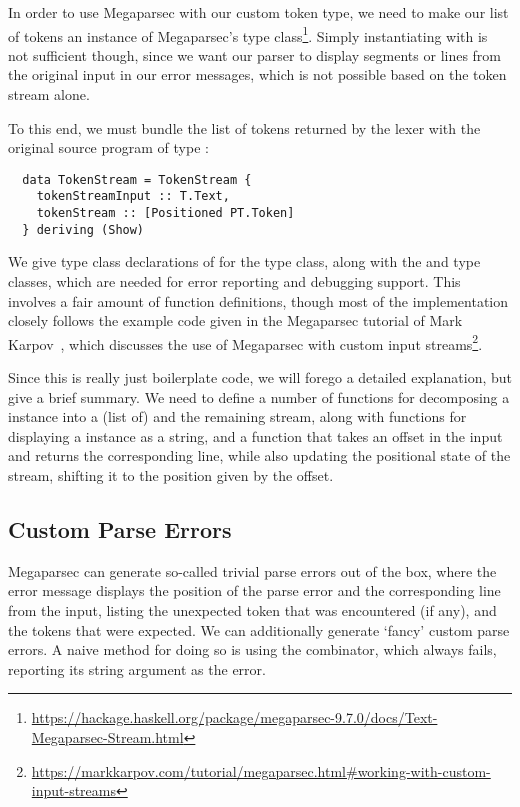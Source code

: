 In order to use Megaparsec with our custom token type, we need to make our list
of tokens an instance of Megaparsec's  type class\footnote{\url{https://hackage.haskell.org/package/megaparsec-9.7.0/docs/Text-Megaparsec-Stream.html}}.
Simply instantiating  with  is not
sufficient though, since we want our parser to display segments or lines from
the original input in our error messages, which is not possible based on the
token stream alone.

To this end, we must bundle the list of tokens returned by the lexer with the
original source program of type :
%
\begin{verbatim}
  data TokenStream = TokenStream {
    tokenStreamInput :: T.Text,
    tokenStream :: [Positioned PT.Token]
  } deriving (Show)
\end{verbatim}
%
We give type class declarations of  for the 
type class, along with the  and 
type classes, which are needed for error reporting and debugging support.
This involves a fair amount of function definitions, though most of the
implementation closely follows the example code given in the Megaparsec tutorial
of Mark Karpov~\citep{Karpov2019}, which discusses the use of Megaparsec with custom input
streams\footnote{\url{https://markkarpov.com/tutorial/megaparsec.html\#working-with-custom-input-streams}}.

Since this is really just boilerplate code, we will forego a detailed
explanation, but give a brief summary.
We need to define a number of functions for decomposing a 
instance into a (list of)  and the remaining stream,
along with functions for displaying a  instance as a
string, and a function that takes an offset in the input and returns the
corresponding line, while also updating the positional state of the stream,
shifting it to the position given by the offset.


\subsection{Custom Parse Errors}

Megaparsec can generate so-called trivial parse errors out of the box, where the
error message displays the position of the parse error and the corresponding
line from the input, listing the unexpected token that was encountered (if any),
and the tokens that were expected.
We can additionally generate `fancy' custom parse errors. A naive method for
doing so is using the  combinator, which always fails, reporting
its string argument as the error.

